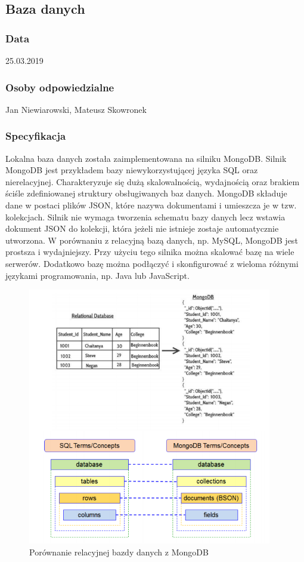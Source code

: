 \subsection{Baza danych }
\subsubsection{Data}
25.03.2019
\subsubsection{Osoby odpowiedzialne}
Jan Niewiarowski, Mateusz Skowronek

\subsubsection{Specyfikacja}
Lokalna baza danych została zaimplementowana na silniku MongoDB. Silnik MongoDB jest przykładem bazy niewykorzystującej języka SQL oraz nierelacyjnej. Charakteryzuje się dużą skalowalnością, wydajnością oraz brakiem ściśle zdefiniowanej struktury obsługiwanych baz danych. MongoDB składuje dane w postaci plików JSON, które nazywa dokumentami i umieszcza je w tzw. kolekcjach. Silnik nie wymaga tworzenia schematu bazy danych lecz wstawia dokument JSON do kolekcji, która jeżeli nie istnieje zostaje automatycznie utworzona. 
\newline
W porównaniu z relacyjną bazą danych, np. MySQL, MongoDB jest prostsza i wydajniejszy. Przy użyciu tego silnika można skalować bazę na wiele serwerów.
Dodatkowo bazę można podłączyć i skonfigurować z wieloma różnymi językami programowania, np. Java lub JavaScript.
\newpage

\begin{figure}[h!]
  \centering
    \includegraphics[width=0.95\textwidth]{img/mongo.png}
  \caption{Porównanie relacyjnej bazdy danych z MongoDB} 
  \label{fig:org}                                       
\end{figure}

